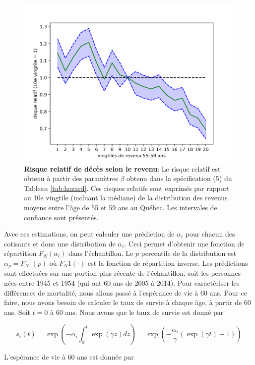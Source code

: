 \documentclass[french, 12pt]{article}
\begin{document}
	\begin{figure}[!htbp]
		\centering
		\includegraphics[scale=0.75]{../figures/gradient.png}
		\caption{\textbf{Risque relatif de décès selon le revenu}: Le risque relatif est obtenu à partir des paramètres $\beta$ obtenu dans la spécification (5) du Tableau \ref{tab:hazard}. Ces risques relatifs sont exprimés par rapport au 10e vingtile (incluant la médiane) de la distribution des revenus moyens entre l'âge de 55 et 59 ans au Québec. Les intervales de confiance sont présentés.}
		\label{fig:gradient}
	\end{figure}
	
	Avec ces estimations, on peut calculer une prédiction de $\alpha_i$ pour chacun des cotisants et donc une distribution de $\alpha_i$. Ceci permet d'obtenir une fonction de répartition $F_N(\alpha_i)$ dans l'échantillon. Le $p$ percentile de la distribution est $\alpha_p = F_N^{-1}(p)$ où $F_N^-1(\cdot)$ est la fonction de répartition inverse. Les prédictions sont effectuées sur une portion plus récente de l’échantillon, soit les personnes nées entre 1945 et 1954 (qui ont 60 ans de 2005 à 2014). Pour caractériser les différences de mortalité, nous allons passé à l'espérance de vie à 60 ans. Pour ce faire, nous avons besoin de calculer le taux de survie à chaque âge, à partir de 60 ans. Soit $t = 0$ à 60 ans. Nous avons que le taux de survie est donné par 
	
	$$ s_i(t) = \exp\left(-\alpha_{i}\int_{0}^t \exp\left(\gamma z\right)dz\right) = \exp\left(-\frac{\alpha_{i}}{\gamma}\left(\exp\left(\gamma t\right)-1\right)\right) $$
	
	L'espérance de vie à 60 ans est donnée par
	
\end{document}
